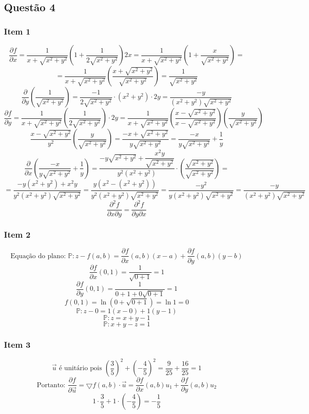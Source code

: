 \documentclass[12pt]{article}
\begin{document}
\subsection{Questão 4}
\subsubsection{Item 1}

\[\dfrac{\partial f}{\partial x} = \dfrac{1}{x+\sqrt{x^{2}+y^{2}}} \left( 1 + \dfrac{1}{2\sqrt{x^{2}+y^{2}}} \right) 2x = \dfrac{1}{x+\sqrt{x^{2}+y^{2}}} \left(1 + \dfrac{x}{\sqrt{x^{2}+y^{2}}}\right) =\]
\[= \dfrac{1}{x+\sqrt{x^{2}+y^{2}}} \left( \dfrac{x+\sqrt{x^{2}+y^{2}}}{\sqrt{x^{2}+y^{2}}} \right) = \dfrac{1}{\sqrt{x^{2}+y^{2}}}\]
\[\dfrac{\partial}{\partial y} \left( \dfrac{1}{\sqrt{x^{2}+y^{2}}} \right) = \dfrac{-1}{2\sqrt{x^{2}+y^{2}}} \cdot (x^{2}+y^{2}) \cdot 2y = \dfrac{-y}{(x^{2}+y^{2})\sqrt{x^{2}+y^{2}}}\]
\[\dfrac{\partial f}{\partial y} = \dfrac{1}{x+\sqrt{x^{2}+y^{2}}} \left( \dfrac{1}{2\sqrt{x^{2}+y^{2}}} \right) \cdot 2y = \dfrac{1}{x+\sqrt{x^{2}+y^{2}}} \left( \dfrac{x-\sqrt{x^{2}+y^{2}}}{x-\sqrt{x^{2}+y^{2}}} \right) \left( \dfrac{y}{\sqrt{x^{2}+y^{2}}} \right)\]
\[\dfrac{x-\sqrt{x^{2}+y^{2}}}{y^{2}} \left( \dfrac{y}{\sqrt{x^{2}+y^{2}}} \right) = \dfrac{-x+\sqrt{x^{2}+y^{2}}}{y\sqrt{x^{2}+y^{2}}} = \dfrac{-x}{y\sqrt{x^{2}+y^{2}}} + \dfrac{1}{y}\]
\[\dfrac{\partial}{\partial x}\left( \dfrac{-x}{y\sqrt{x^{2}+y^{2}}} + \dfrac{1}{y} \right) = \dfrac{-y\sqrt{x^{2}+y^{2}} + \dfrac{x^{2}y}{\sqrt{x^{2}+y^{2}}} }{y^{2}(x^{2}+y^{2})} \cdot \left( \dfrac{\sqrt{x^{2}+y^{2}}}{\sqrt{x^{2}+y^{2}}} \right) =\]
\[= \dfrac{-y(x^{2}+y^{2}) + x^{2}y}{y^{2}(x^{2}+y^{2})\sqrt{x^{2}+y^{2}}} = \dfrac{y(x^{2}-(x^{2}+y^{2}))}{y^{2}(x^{2}+y^{2})\sqrt{x^{2}+y^{2}}} = \dfrac{-y^{2}}{y(x^{2}+y^{2})\sqrt{x^{2}+y^{2}}} = \dfrac{-y}{(x^{2}+y^{2})\sqrt{x^{2}+y^{2}}}\]
\[\dfrac{\partial^{2}f}{\partial x\partial y} = \dfrac{\partial^{2}f}{\partial y\partial x}\]

\subsubsection{Item 2}

\[\text{Equação do plano: } \mathds{P}: z-f(a,b) = \dfrac{\partial f}{\partial x}(a,b)(x-a) + \dfrac{\partial f}{\partial y}(a,b)(y-b)\]
\[\dfrac{\partial f}{\partial x} (0,1) = \dfrac{1}{\sqrt{0+1}} = 1\]
\[\dfrac{\partial f}{\partial y} (0,1) = \dfrac{1}{0+1+0\sqrt{0+1}} = 1\]
\[f(0,1) = \ln(0+\sqrt{0+1}) = \ln1 = 0\]
\[\mathds{P}: z-0 = 1(x-0) + 1(y-1)\]
\[\mathds{P}: z = x+y-1\]
\[\mathds{P}: x+y-z = 1\]

\subsubsection{Item 3}

\[\overrightarrow{u} \text{ é unitário pois } \left( \dfrac{3}{5} \right)^{2} + \left( -\dfrac{4}{5} \right)^{2} = \dfrac{9}{25} + \dfrac{16}{25} = 1\]
\[\text{Portanto: } \dfrac{\partial f}{\partial \overrightarrow{u}} = \bigtriangledown f(a,b) \cdot \overrightarrow{u} =  \dfrac{\partial f}{\partial x}(a,b)u_{1} + \dfrac{\partial f}{\partial y}(a,b)u_{2}\]
\[1 \cdot \dfrac{3}{5} + 1 \cdot \left( -\dfrac{4}{5} \right) = -\dfrac{1}{5}\]
\end{document}
